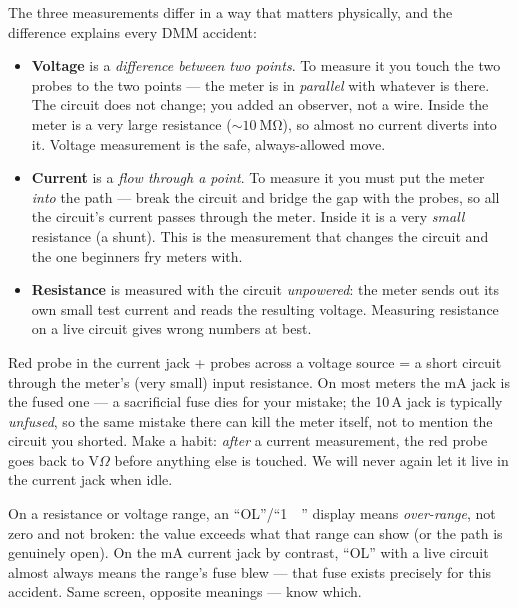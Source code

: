 The three measurements differ in a way that matters physically, and the
difference explains every DMM accident:

\begin{itemize}
\item \textbf{Voltage} is a \emph{difference between two points}. To measure
it you touch the two probes to the two points — the meter is in
\emph{parallel} with whatever is there.
The circuit does not change; you added an observer, not a wire. Inside the
meter is a very large resistance ($\sim\qty{10}{\mega\ohm}$), so almost no
current diverts into it. Voltage measurement is the safe, always-allowed move.
\item \textbf{Current} is a \emph{flow through a point}. To measure it you must
put the meter \emph{into} the path — break the circuit
and bridge the gap with the probes, so all the circuit's current passes through
the meter. Inside it is a very \emph{small} resistance (a shunt). This is the
measurement that changes the circuit and the one beginners fry meters with.
\item \textbf{Resistance} is measured with the circuit \emph{unpowered}: the
meter sends out its own small test current and reads the resulting voltage.
Measuring resistance on a live circuit gives wrong numbers at best.
\end{itemize}

\begin{tripwire}
Red probe in the current jack + probes across a voltage source = a short
circuit through the meter's (very small) input resistance. On most meters the
mA jack is the fused one — a sacrificial fuse dies for your mistake; the
10\,A jack is typically \emph{unfused}, so the same mistake there can kill
the meter itself, not to mention the circuit you shorted. Make a habit: \emph{after} a
current measurement, the red probe goes back to V$\Omega$ before anything else
is touched. We will never again let it live in the current jack when idle.
\end{tripwire}

\begin{tripwire}[``OL'' is an answer]
On a resistance or voltage range, an ``OL''/``1\ \ '' display means
\emph{over-range}, not zero and not broken: the value exceeds what that range
can show (or the path is genuinely open). On the mA current jack by
contrast, ``OL'' with a live circuit almost always means the range's fuse
blew — that fuse exists precisely for this accident. Same screen, opposite
meanings — know which.
\end{tripwire}

